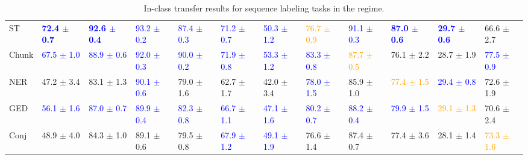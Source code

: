 \begin{landscape}
\begin{table}[t]
\begin{adjustbox}{max width=2\textwidth}
\begin{tabular}{ l l l l l  l l l l  l l l }
ST & \textbf{\textcolor{blue}{72.4 $\pm$ 0.7}} & \textbf{\textcolor{blue}{92.6 $\pm$ 0.4}} & \textcolor{blue}{93.2 $\pm$ 0.2} & \textcolor{blue}{87.4 $\pm$ 0.3} & \textcolor{blue}{71.2 $\pm$ 0.7} & \textcolor{blue}{50.3 $\pm$ 1.2} & \textcolor{orange}{76.7 $\pm$ 0.9} & \textcolor{blue}{91.1 $\pm$ 0.3} & \textbf{\textcolor{blue}{87.0 $\pm$ 0.6}} & \textbf{\textcolor{blue}{29.7 $\pm$ 0.6}} & 66.6 $\pm$ 2.7\\
Chunk & \textcolor{blue}{67.5 $\pm$ 1.0} & \textcolor{blue}{88.9 $\pm$ 0.6} & \textcolor{blue}{92.0 $\pm$ 0.3} & \textcolor{blue}{90.0 $\pm$ 0.2} & \textcolor{blue}{71.9 $\pm$ 0.8} & \textcolor{blue}{53.3 $\pm$ 1.2} & \textcolor{blue}{83.3 $\pm$ 0.8} & \textcolor{orange}{87.7 $\pm$ 0.5} & 76.1 $\pm$ 2.2 & 28.7 $\pm$ 1.9 & \textcolor{blue}{77.5 $\pm$ 0.9}\\
NER & 47.2 $\pm$ 3.4 & 83.1 $\pm$ 1.3 & \textcolor{blue}{90.1 $\pm$ 0.6} & 79.0 $\pm$ 1.6 & 62.7 $\pm$ 1.7 & 42.0 $\pm$ 3.4 & \textcolor{blue}{78.0 $\pm$ 1.5} & 85.9 $\pm$ 1.0 & \textcolor{orange}{77.4 $\pm$ 1.5} & \textcolor{blue}{29.4 $\pm$ 0.8} & 72.6 $\pm$ 1.9\\
GED & \textcolor{blue}{56.1 $\pm$ 1.6} & \textcolor{blue}{87.0 $\pm$ 0.7} & \textcolor{blue}{89.9 $\pm$ 0.4} & \textcolor{blue}{82.3 $\pm$ 0.8} & \textcolor{blue}{66.7 $\pm$ 1.1} & \textcolor{blue}{47.1 $\pm$ 1.6} & \textcolor{blue}{80.2 $\pm$ 0.7} & \textcolor{blue}{88.2 $\pm$ 0.4} & \textcolor{blue}{79.9 $\pm$ 1.5} & \textcolor{orange}{29.1 $\pm$ 1.3} & 70.6 $\pm$ 2.4\\
Conj & 48.9 $\pm$ 4.0 & 84.3 $\pm$ 1.0 & 89.1 $\pm$ 0.6 & 79.5 $\pm$ 0.8 & \textcolor{blue}{67.9 $\pm$ 1.2} & \textcolor{blue}{49.1 $\pm$ 1.9} & 76.6 $\pm$ 1.4 & 87.4 $\pm$ 0.7 & 77.4 $\pm$ 3.6 & 28.1 $\pm$ 1.4 & \textcolor{orange}{73.3 $\pm$ 1.6}\\
\bottomrule
\end{tabular}
\end{adjustbox}
\caption{In-class transfer results for sequence labeling tasks in the  regime.}
\label{tbla6b}
\end{table}
\end{landscape}